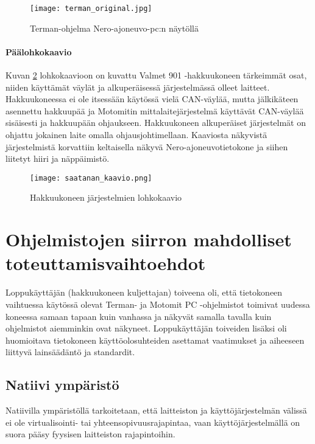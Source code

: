 \begin{figure}[H]
\centering
\texttt{[image: terman\_original.jpg]}
\caption{Terman-ohjelma Nero-ajoneuvo-pc:n näytöllä}
\label{kuva_terman}
\end{figure}

\subsubsection{Päälohkokaavio}
Kuvan \ref{kuva_lohkokaavio} lohkokaavioon on kuvattu Valmet 901 -hakkuukoneen tärkeimmät osat, niiden käyttämät väylät ja alkuperäisessä järjestelmässä olleet laitteet. Hakkuukoneessa ei ole itsessään käytössä vielä CAN-väylää, mutta jälkikäteen asennettu hakkuupää ja Motomitin mittalaitejärjestelmä käyttävät CAN-väylää sisäisesti ja hakkuupään ohjaukseen. Hakkuukoneen alkuperäiset järjestelmät on ohjattu jokainen laite omalla ohjausjohtimellaan. Kaaviosta näkyvistä järjestelmistä korvattiin keltaisella näkyvä Nero-ajoneuvotietokone ja siihen liitetyt hiiri ja näppäimistö.

\begin{figure}[H]
\centering
\texttt{[image: saatanan\_kaavio.png]}
\caption{Hakkuukoneen järjestelmien lohkokaavio}
\label{kuva_lohkokaavio}
\end{figure}

\newpage
\chapter{Ohjelmistojen siirron mahdolliset toteuttamisvaihtoehdot}

Loppukäyttäjän (hakkuukoneen kuljettajan) toiveena oli, että tietokoneen vaihtuessa käytössä olevat Terman- ja Motomit PC -ohjelmistot toimivat uudessa koneessa samaan tapaan kuin vanhassa ja näkyvät samalla tavalla kuin ohjelmistot aiemminkin ovat näkyneet. Loppukäyttäjän toiveiden lisäksi oli huomioitava tietokoneen käyttöolosuhteiden asettamat vaatimukset ja aiheeseen liittyvä lainsäädäntö ja standardit.

\section{Natiivi ympäristö}
Natiivilla ympäristöllä tarkoitetaan, että laitteiston ja käyttöjärjestelmän välissä ei ole virtualisointi- tai yhteensopivuusrajapintaa, vaan käyttöjärjestelmällä on suora pääsy fyysisen laitteiston rajapintoihin.


